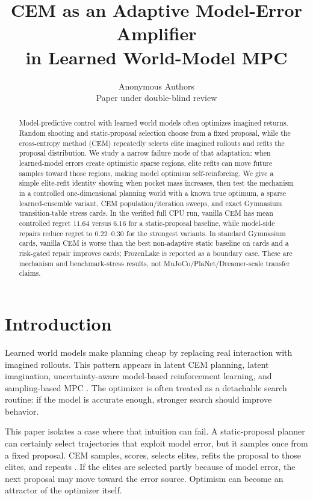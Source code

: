 \documentclass{article}
\title{CEM as an Adaptive Model-Error Amplifier\\in Learned World-Model MPC}
\author{Anonymous Authors\\Paper under double-blind review}
\newcommand{\cem}{\textsc{CEM}}
\begin{document}
\maketitle

\begin{abstract}
Model-predictive control with learned world models often optimizes imagined returns. Random shooting and static-proposal selection choose from a fixed proposal, while the cross-entropy method (\cem{}) repeatedly selects elite imagined rollouts and refits the proposal distribution. We study a narrow failure mode of that adaptation: when learned-model errors create optimistic sparse regions, elite refits can move future samples toward those regions, making model optimism self-reinforcing. We give a simple elite-refit identity showing when pocket mass increases, then test the mechanism in a controlled one-dimensional planning world with a known true optimum, a sparse learned-ensemble variant, CEM population/iteration sweeps, and exact Gymnasium transition-table stress cards. In the verified full CPU run, vanilla \cem{} has mean controlled regret $11.64$ versus $6.16$ for a static-proposal baseline, while model-side repairs reduce regret to $0.22$--$0.30$ for the strongest variants. In \VFourGymBenchmarks{} standard Gymnasium cards, vanilla \cem{} is worse than the best non-adaptive static baseline on \VFourGymCEMWorseCount{} cards and a risk-gated repair improves \VFourGymRepairCount{} cards; FrozenLake is reported as a boundary case. These are mechanism and benchmark-stress results, not MuJoCo/PlaNet/Dreamer-scale transfer claims.
\end{abstract}

\section{Introduction}

Learned world models make planning cheap by replacing real interaction with imagined rollouts. This pattern appears in latent CEM planning, latent imagination, uncertainty-aware model-based reinforcement learning, and sampling-based MPC \citep{hafner2019planet,hafner2020dreamer,chua2018pets,nagabandi2018neural,williams2017information}. The optimizer is often treated as a detachable search routine: if the model is accurate enough, stronger search should improve behavior.

This paper isolates a case where that intuition can fail. A static-proposal planner can certainly select trajectories that exploit model error, but it samples once from a fixed proposal. \cem{} samples, scores, selects elites, refits the proposal to those elites, and repeats \citep{rubinstein1999cem,deboer2005tutorial,bharadhwaj2020mpc}. If the elites are selected partly because of model error, the next proposal may move toward the error source. Optimism can become an attractor of the optimizer itself.
\end{document}
